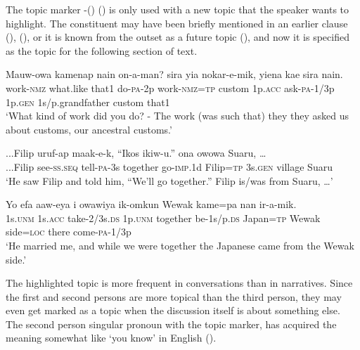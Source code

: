 The topic marker -() () is only used with a new topic that the speaker wants to highlight. The constituent may have been briefly mentioned in an earlier clause (), (), or it is known from the outset as a future topic (), and now it is specified as the topic for the following section of text. 

\ea%
\label{ex:x1680}
\gll Mauw-owa  kamenap  nain  on-a-man?   sira  yia  nokar-e-mik,  yiena  kae  sira nain.\\
work-\textsc{nmz}  what.like  that1  do-\textsc{pa}-2p  work-\textsc{nmz}=\textsc{tp} custom  1p.\textsc{acc}  ask-\textsc{pa}-1/3p  1p.\textsc{gen}  1s/p.grandfather  custom that1    \\
\glt`What kind of work did you do? - The work (was such that) they they asked us about customs, our ancestral customs.'
\z


\ea%
\label{ex:x1678}
\gll ...Filip  uruf-ap  maak-e-k,  ``Ikos  ikiw-u.''   ona  owowa  Suaru,  {\dots}\\
...Filip  see-\textsc{ss}.\textsc{seq}  tell-\textsc{pa}-3s  together  go-\textsc{imp}.1d  Filip=\textsc{tp} 3s.\textsc{gen}  village  Suaru     \\
\glt`He saw Filip and told him, ``We'll go together.'' Filip is/was from Suaru, {\dots}'
\z


\ea%
\label{ex:x1679}
\gll Yo  efa  aaw-eya  i  owawiya  ik-omkun   Wewak  kame=pa  nan  ir-a-mik. \\
1s.\textsc{unm}  1s.\textsc{acc}  take-2/3s.\textsc{ds}  1p.\textsc{unm}  together  be-1s/p.\textsc{ds} Japan=\textsc{tp}  Wewak  side=\textsc{loc}  there  come-\textsc{pa}-1/3p     \\
\glt`He married me, and while we were together the Japanese came from the Wewak side.'
\z


The highlighted topic is more frequent in conversations than in narratives. Since the first and second persons are more topical than the third person, they may even get marked as a topic when the discussion itself is about something else. The second person singular pronoun with the topic marker,  has acquired the meaning somewhat like `you know' in English ().

